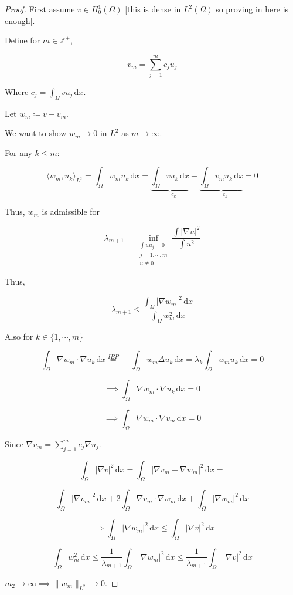 \documentclass{article}
\theoremstyle{definition}
\begin{document}
\begin{proof}
    First assume \(v\in H^1_0(\Omega)\) [this is dense in \(L^2(\Omega)\) so proving in here is enough].

    Define for \(m \in \mathbb{Z}^+\),

    \[
        v_m = \sum_{j=1}^m c_j u_j
    \]

    Where \(c_j = \int_{\Omega} v u_j \,\mathrm{d}x \).

    Let \(w_m \coloneqq v - v_m\).
    
    We want to show \(w_m \to 0\) in \(L^2\) as \(m\to \infty\).

    For any \(k \leq m\):

    \[
        \langle w_m, u_k \rangle_{L^2} = \int_{\Omega} w_m u_k \,\mathrm{d}x = \underbrace{\int_{\Omega} v u_k \,\mathrm{d}x}_{=c_k} - \underbrace{\int_{\Omega} v_m u_k \,\mathrm{d}x}_{=c_k} = 0 
    \]

    Thus, \(w_m\) is admissible for

    \[
        \lambda_{m+1} = \inf_{\substack{\int u u_j = 0 \\ j = 1, \cdots , m \\ u  \not\equiv 0}} \frac{\int \vert \nabla u \vert ^2}{\int u^2}
    \]

    Thus,

    \[
        \lambda_{m+1} \leq \frac{\int_{\Omega} \vert \nabla w_m \vert ^2 \,\mathrm{d}x }{\int_{\Omega} w_m^2 \,\mathrm{d}x }
    \]

    Also for \(k\in \{ 1, \cdots , m \} \)

    \[
        \int_{\Omega} \nabla w_m \cdot\nabla u_k \,\mathrm{d}x \overset{IBP}{=} - \int_{\Omega} w_m \Delta u_k \,\mathrm{d}x = \lambda_k \int_{\Omega} w_m u_k \,\mathrm{d}x = 0
    \]

    \[
        \implies \int_{\Omega} \nabla w_m \cdot \nabla u_k \,\mathrm{d}x = 0
    \]

    \[
        \implies \int_{\Omega} \nabla w_m \cdot \nabla v_m \,\mathrm{d}x = 0
    \]

    Since \(\nabla v_m = \sum_{j=1}^m c_j \nabla u_j\).

    \[
        \int_{\Omega} \vert \nabla v \vert ^2 \,\mathrm{d}x = \int_{\Omega} \vert \nabla v_m + \nabla w_m \vert ^2 \,\mathrm{d}x =
    \]
    
    \[
        \int_{\Omega} \vert \nabla v_m \vert ^2 \,\mathrm{d}x + 2 \int_{\Omega} \nabla v_m \cdot \nabla w_m \,\mathrm{d}x + \int_{\Omega} \vert \nabla w_m \vert ^2 \,\mathrm{d}x 
    \]

    \[
        \implies \int_{\Omega} \vert \nabla w_m \vert ^2 \,\mathrm{d}x \leq \int_{\Omega} \vert \nabla v \vert ^2 \,\mathrm{d}x 
    \]

    \[
        \int_{\Omega} w_m^2 \,\mathrm{d}x \leq \frac{1}{\lambda_{m+1}} \int_{\Omega} \vert \nabla w_m \vert ^2 \,\mathrm{d}x \leq \frac{1}{\lambda_{m+1}} \int_{\Omega} \vert \nabla v \vert ^2 \,\mathrm{d}x 
    \]

    \(m_2 \to \infty \implies \lVert w_m \rVert _{L^2} \to 0\). 
\end{proof}
\end{document}
